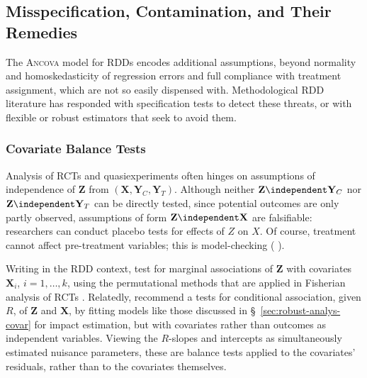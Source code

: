 \subsection{Misspecification, Contamination, and Their Remedies}\label{sec:specification}

The \textsc{Ancova} model for RDDs encodes additional assumptions,
beyond normality and homoskedasticity of regression errors and full
compliance with treatment assignment, which are not so easily
dispensed with.
Methodological RDD literature has responded with specification tests
to detect these threats, or with flexible or robust estimators that
seek to avoid them.

\subsubsection{Covariate Balance Tests}
Analysis of RCTs and quasiexperiments often hinges on assumptions of
independence of
 $\mathbf{Z}$ from $(\mathbf{X}, \mathbf{Y}_{C}, \mathbf{Y}_{T})$.
 Although neither $\mathbf{Z} \independent \mathbf{Y}_{C}$ nor
 $\mathbf{Z} \independent \mathbf{Y}_{T}$ can be directly tested,
 since potential outcomes are only partly observed, assumptions of form
 $\mathbf{Z} \independent \mathbf{X}$ are falsifiable: researchers can
 conduct placebo tests for effects of $Z$ on $X$.
Of course, treatment cannot affect pre-treatment variables; this is
model-checking (%
\citealp[][\S~5.13]{cox2006pos}%
).  %

 Writing in the RDD context, \citet{cattaneo2014randomization} test
 for marginal associations of $\mathbf{Z}$ with covariates $\mathbf{X}_{i}$,
 $i=1, \ldots, k$, using the permutational methods that are applied
 in Fisherian analysis of RCTs \citep[also see][]{liMatteiMealli2015BayesianRD}.
Relatedly, \citet{lee2010regression} recommend a
 tests for conditional association, given $R$, of $\mathbf{Z}$ and
 $\mathbf{X}$, by fitting models like those discussed in
 \S~\ref{sec:robust-analys-covar} for impact estimation, but with
 covariates rather than outcomes as independent variables. 
Viewing the $R$-slopes and intercepts as simultaneously estimated
 nuisance parameters, these are balance tests applied to
 the covariates' residuals, %
rather than to the covariates themselves.

